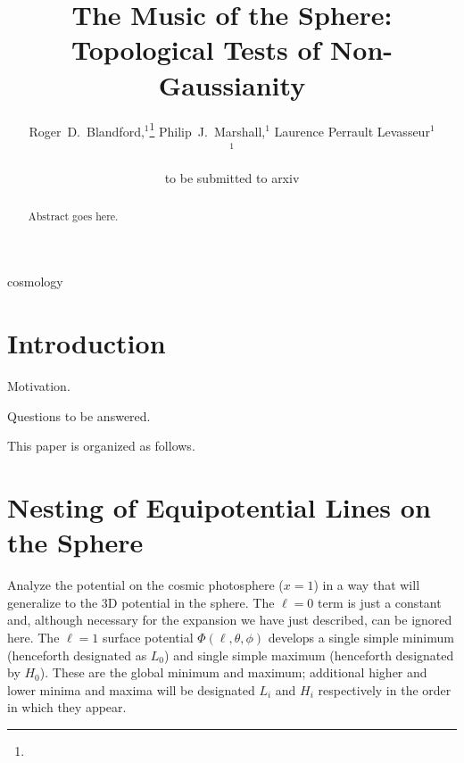 \documentclass[useAMS,usenatbib,a4paper]{mn2e}
\title[Topological Non-Gaussianity Tests]
{The Music of the Sphere: Topological Tests of Non-Gaussianity}
\author[Blandford et al.]{%
    Roger~D.~Blandford,$^{1}$\thanks{\rdbemail}
    Philip~J.~Marshall,$^{1}$
    Laurence Perrault Levasseur$^{1}$
    \medskip\\
    $^1$\kipac
}
\begin{document}
\date{to be submitted to arxiv}
\pagerange{\pageref{firstpage}--\pageref{lastpage}}

\maketitle

\label{firstpage}


\begin{abstract}

Abstract goes here.

\end{abstract}


\begin{keywords}
  cosmology
\end{keywords}

\setcounter{footnote}{1}


\section{Introduction}

Motivation.

Questions to be answered.

This paper is organized as follows.


\section{Nesting of Equipotential Lines on the Sphere}

Analyze the potential on the cosmic photosphere ($x=1$) in a way that
will generalize to the 3D potential in the sphere. The $\ell=0$ term
is just a constant and, although necessary for the expansion we have
just described, can be ignored here.  The $\ell=1$ surface potential
$\Phi(\ell,\theta,\phi)$ develops a single simple minimum (henceforth
designated as $L_0$) and single simple maximum (henceforth designated
by $H_0$). These are the global  minimum and maximum; additional
higher and lower minima and maxima will be designated $L_i$ and $H_i$
respectively in the order in which they appear.
\end{document}
